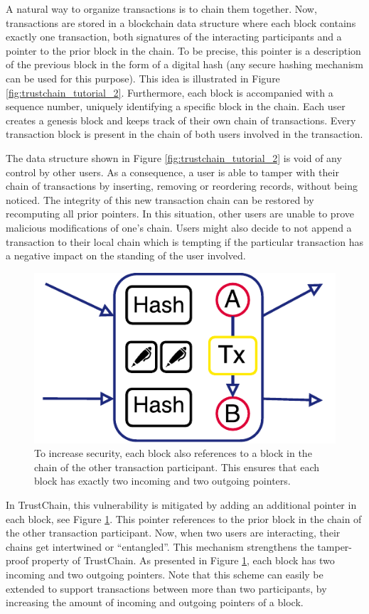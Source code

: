 \documentclass[USenglish]{article}
\begin{document}
A natural way to organize transactions is to chain them together.
Now, transactions are stored in a blockchain data structure where each block contains exactly one transaction, both signatures of the interacting participants and a pointer to the prior block in the chain.
To be precise, this pointer is a description of the previous block in the form of a digital hash (any secure hashing mechanism can be used for this purpose).
This idea is illustrated in Figure \ref{fig:trustchain_tutorial_2}.
Furthermore, each block is accompanied with a sequence number, uniquely identifying a specific block in the chain.
Each user creates a genesis block and keeps track of their own chain of transactions.
Every transaction block is present in the chain of both users involved in the transaction.

The data structure shown in Figure \ref{fig:trustchain_tutorial_2} is void of any control by other users. As a consequence, a user is able to tamper with their chain of transactions by inserting, removing or reordering records, without being noticed.
The integrity of this new transaction chain can be restored by recomputing all prior pointers.
In this situation, other users are unable to prove malicious modifications of one's chain.
Users might also decide to not append a transaction to their local chain which is tempting if the particular transaction has a negative impact on the standing of the user involved.

\begin{figure}[h!]
	\centering
	\includegraphics[width=0.5\columnwidth]{assets/trustchain_tutorial_3}
	\caption{To increase security, each block also references to a block in the chain of the other transaction participant. This ensures that each block has exactly two incoming and two outgoing pointers.}
	\label{fig:trustchain_tutorial_3}
\end{figure}

In TrustChain, this vulnerability is mitigated by adding an additional pointer in each block, see Figure \ref{fig:trustchain_tutorial_3}.
This pointer references to the prior block in the chain of the other transaction participant.
Now, when two users are interacting, their chains get intertwined or \enquote{entangled}.
This mechanism strengthens the tamper-proof property of TrustChain.
As presented in Figure \ref{fig:trustchain_tutorial_3}, each block has two incoming and two outgoing pointers.
Note that this scheme can easily be extended to support transactions between more than two participants, by increasing the amount of incoming and outgoing pointers of a block.
\end{document}
